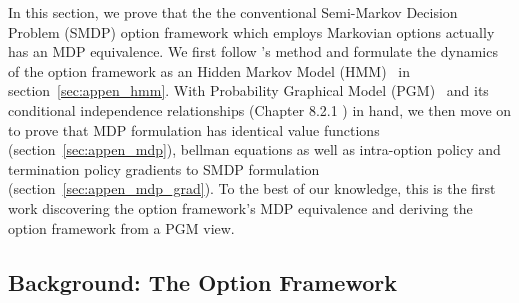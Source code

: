 In this section, we prove that the the conventional Semi-Markov
Decision Problem (SMDP) option framework which employs Markovian
options actually has an MDP equivalence. We first follow
's method and formulate the dynamics
of the option framework as an Hidden Markov Model
(HMM)~\cite{bishop2006pattern} in section~\ref{sec:appen_hmm}.
With Probability Graphical Model (PGM)~\cite{bishop2006pattern}
and its conditional independence relationships (Chapter 8.2.1
\cite{bishop2006pattern}) in hand, we then move on to prove that
MDP formulation has identical value functions
(section~\ref{sec:appen_mdp}), bellman equations as well as
intra-option policy and termination policy gradients to SMDP
formulation (section~\ref{sec:appen_mdp_grad}). To the best of
our knowledge, this is the first work discovering the option
framework's MDP equivalence and deriving the option framework
from a PGM view.

\subsection{Background: The Option Framework}
\label{sec:appen_oc_background}


